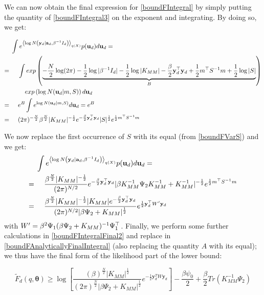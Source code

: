 We can now obtain the final expression for \eqref{boundFIntegral} by simply putting the quantity of \eqref{boundFIntegral3} on the exponent and integrating. By doing so, we get:

\begin{align}
{}& \int e^{\left\langle \log N \left( \mathbf{y}_d | \mathbf{a}_d, \beta^{-1} I_d \right) \right\rangle_{q(X)}}
		p(\mathbf{u}_d) d\mathbf{u}_d = \nonumber \\
= {}& \;\;\;\;
\int
 exp \left(
\underbrace{
  - \frac{N}{2} \log (2 \pi) - \frac{1}{2} \log \vert \beta^{-1} I_d \vert
  - \frac{1}{2} \log \vert K_{MM} \vert
  - \frac{\beta}{2} \mathbf{y}_d^{\top} \mathbf{y}_d + \frac{1}{2} m^{\top} S^{-1} m + \frac{1}{2} \log \vert S \vert
}_{B}
 \right)  \nonumber \\
{}& \;\;\;\;\;\;
\;\;  exp \left( \log N(\mathbf{u}_d | m, S) \right) d\mathbf{u}_d \nonumber \\
= {}& \;\;\;\;
	e^{B} \int e^{\log N(\mathbf{u}_d | m, S)} d\mathbf{u}_d = e^{B} \nonumber \\
= {}& \;\;\;\;
	(2 \pi)^{-\frac{N}{2}} \beta^{\frac{N}{2}} \vert K_{MM} \vert^{-\frac{1}{2}}
	e^{- \frac{\beta}{2} \mathbf{y}_d^{\top} \mathbf{y}_d} \vert S \vert^{\frac{1}{2}} e^{\frac{1}{2}m^{\top} S^{-1} m} \nonumber
\end{align}

We now replace the first occurrence of $S$ with its equal (from \eqref{boundFVarS}) and we get:
\begin{align}
{}& \int e^{\left\langle \log N \left( \mathbf{y}_d | \mathbf{a}_d, \beta^{-1} I_d \right) \right\rangle_{q(X)}}
		p(\mathbf{u}_d) d\mathbf{u}_d = \nonumber \\
= {}& \;\;\;\;
\frac{\beta^{\frac{N}{2}} \vert K_{MM} \vert^{-\frac{1}{2}}}{(2 \pi)^{N/2}} e^{-\frac{\beta}{2} \mathbf{y}_d^{\top} \mathbf{y}_d}
	\vert \beta K_{MM}^{-1} \Psi_2 K_{MM}^{-1} + K_{MM}^{-1} \vert^{-\frac{1}{2}} e^{\frac{1}{2} m^{\top} S^{-1} m} \nonumber \\
= {}& \;\;\;\;
\frac{\beta^{\frac{N}{2}} \vert K_{MM} \vert^{-\frac{1}{2}} \vert K_{MM} \vert e^{-\frac{\beta}{2} \mathbf{y}_d^{\top} \mathbf{y}_d}}
	 {(2 \pi)^{N/2}  \vert \beta \Psi_2 + K_{MM} \vert^{\frac{1}{2}} }
	 e^{\frac{1}{2} \mathbf{y}_d^{\top} W' \mathbf{y}_d}
\label{boundFIntegralFinal2}
\end{align}
with $W' = \beta^2 \Psi_1 (\beta \Psi_2 + K_{MM})^{-1} \Psi_1^{\top}$.
Finally, we perform some further calculations in \eqref{boundFIntegralFinal2} and replace in \eqref{boundFAnalyticallyFinalIntegral} (also replacing the quantity $A$ with its equal); we thus have the final form of the likelihood part of the lower bound:

\begin{equation}
\label{FdFinal}
\mathit{\tilde{F}_d}(q, \boldsymbol \theta) \geq \log \left[ 
	\frac{(\beta)^{\frac{N}{2}} \vert \mathit{K_{MM}} \vert ^\frac{1}{2} }
		 {(2\pi)^{\frac{N}{2}} \vert \beta \Psi_2 + \mathit{K_{MM}}  \vert ^\frac{1}{2} } 
	 e^{-\frac{1}{2} \mathbf{y}^{T}_{d} W \mathbf{y}_d}
	 \right]	 -
	 \frac{\beta \psi_0}{2} + \frac{\beta}{2} 
	 Tr \left( \mathit{K_{MM}^{-1}} \Psi_2 \right)	
\end{equation}


